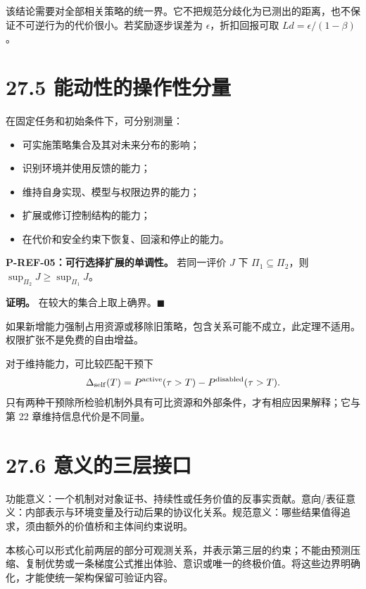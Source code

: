 \documentclass[
  11pt,
  oneside]{book}
\providecommand{\tightlist}{%
  \setlength{\itemsep}{0pt}\setlength{\parskip}{0pt}}
\begin{document}
该结论需要对全部相关策略的统一界。它不把规范分歧化为已测出的距离，也不保证不可逆行为的代价很小。若奖励逐步误差为 \(\epsilon\)，折扣回报可取 \(Ld=\epsilon/(1-\beta)\)。

\section{27.5 能动性的操作性分量}\label{ux80fdux52a8ux6027ux7684ux64cdux4f5cux6027ux5206ux91cf}

在固定任务和初始条件下，可分别测量：

\begin{itemize}
\tightlist
\item
  可实施策略集合及其对未来分布的影响；
\item
  识别环境并使用反馈的能力；
\item
  维持自身实现、模型与权限边界的能力；
\item
  扩展或修订控制结构的能力；
\item
  在代价和安全约束下恢复、回滚和停止的能力。
\end{itemize}

\hypertarget{p-ref-05}{}\label{p-ref-05}

\textbf{P-REF-05：可行选择扩展的单调性。} 若同一评价 \(J\) 下 \(\Pi_1\subseteq\Pi_2\)，则 \(\sup_{\Pi_2}J\ge\sup_{\Pi_1}J\)。

\textbf{证明。} 在较大的集合上取上确界。\(\blacksquare\)

如果新增能力强制占用资源或移除旧策略，包含关系可能不成立，此定理不适用。权限扩张不是免费的自由增益。

对于维持能力，可比较匹配干预下 \[\Delta_{\rm self}(T)
=P^{\rm active}(\tau>T)-P^{\rm disabled}(\tau>T).\] 只有两种干预除所检验机制外具有可比资源和外部条件，才有相应因果解释；它与第 22 章维持信息代价是不同量。

\section{27.6 意义的三层接口}\label{ux610fux4e49ux7684ux4e09ux5c42ux63a5ux53e3}

功能意义：一个机制对对象证书、持续性或任务价值的反事实贡献。意向/表征意义：内部表示与环境变量及行动后果的协议化关系。规范意义：哪些结果值得追求，须由额外的价值桥和主体间约束说明。

本核心可以形式化前两层的部分可观测关系，并表示第三层的约束；不能由预测压缩、复制优势或一条梯度公式推出体验、意识或唯一的终极价值。将这些边界明确化，才能使统一架构保留可验证内容。
\end{document}
